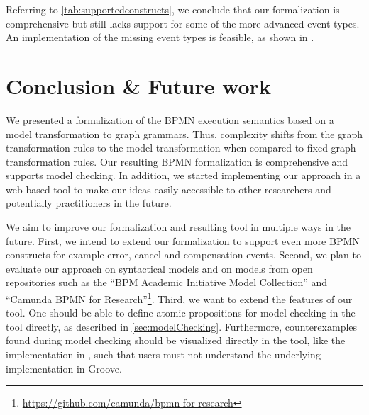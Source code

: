 \documentclass[submission, copyright, creativecommons]{eptcs}
\begin{document}
Referring to \cref{tab:supportedconstructs}, we conclude that our formalization is comprehensive but still lacks support for some of the more advanced event types.
An implementation of the missing event types is feasible, as shown in \cite{vangorpVisualTokenbasedFormalization2013}.

\section{Conclusion \& Future work} \label{sec:conclusion}
We presented a formalization of the BPMN execution semantics based on a model transformation to graph grammars.
Thus, complexity shifts from the graph transformation rules to the model transformation when compared to fixed graph transformation rules.
Our resulting BPMN formalization is comprehensive and supports model checking.
In addition, we started implementing our approach in a web-based tool to make our ideas easily accessible to other researchers and potentially practitioners in the future.

We aim to improve our formalization and resulting tool in multiple ways in the future.
First, we intend to extend our formalization to support even more BPMN constructs for example error, cancel and compensation events.
Second, we plan to evaluate our approach on syntactical models and on models from open repositories such as the \enquote{BPM Academic Initiative Model Collection} \cite{weskeModelCollectionBusiness2020} and  \enquote{Camunda BPMN for
Research}\footnote{\url{https://github.com/camunda/bpmn-for-research}}.
Third, we want to extend the features of our tool.
One should be able to define atomic propositions for model checking in the tool directly, as described in \cref{sec:modelChecking}.
Furthermore, counterexamples found during model checking should be visualized directly in the tool, like the implementation in \cite{houhouFirstOrderLogicVerification2022}, such that users must not understand the underlying implementation in Groove.


\end{document}
